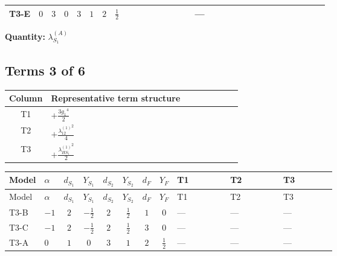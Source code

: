 \documentclass[8pt]{article}
\begin{document}
\begin{landscape}
\begin{longtable}{@{}llcccccc >{\raggedright\arraybackslash}p{0.21\linewidth} >{\raggedright\arraybackslash}p{0.21\linewidth} >{\raggedright\arraybackslash}p{0.21\linewidth}@{}}
\midrule
T3-E & $0$ & $3$ & $0$ & $3$ & $1$ & $2$ & $\frac{1}{2}$ & \scriptsize\adjustbox{max width=\linewidth}{$\begin{gathered} +\frac{3 {g_2}^4}{4}\end{gathered}$} & --- & \scriptsize\adjustbox{max width=\linewidth}{$\begin{gathered} +{g_2}^2 (-3 {\lambda_{S_1}^{(1)}}-24 {\lambda_{S_1}^{(A)}})\end{gathered}$} \\
\midrule
\bottomrule
\end{longtable}
\clearpage
\noindent\textbf{Quantity: }$\lambda_{S_1}^{(A)}$\par\smallskip
\subsection*{Terms 3 of 6}
\begin{center}
\begin{tabular}{@{}c >{\raggedright\arraybackslash}p{0.82\linewidth}@{}}
\toprule
Column & Representative term structure \\
\midrule
T1 & \(\displaystyle +\frac{3 {g_1}^4}{2}\) \\
\midrule
T2 & \(\displaystyle +\frac{{\lambda_{12}^{(1)}}^2}{4}\) \\
\midrule
T3 & \(\displaystyle +\frac{{\lambda_{HS_1}^{(1)}}^2}{2}\) \\
\midrule
\bottomrule
\end{tabular}
\end{center}
\smallskip
\tiny
\begin{longtable}{@{}llcccccc >{\raggedright\arraybackslash}p{0.21\linewidth} >{\raggedright\arraybackslash}p{0.21\linewidth} >{\raggedright\arraybackslash}p{0.21\linewidth}@{}}
\toprule
Model & $\alpha$ & $d_{S_1}$ & $Y_{S_1}$ & $d_{S_2}$ & $Y_{S_2}$ & $d_F$ & $Y_F$ & T1 & T2 & T3 \\
\midrule
\endfirsthead
\toprule
Model & $\alpha$ & $d_{S_1}$ & $Y_{S_1}$ & $d_{S_2}$ & $Y_{S_2}$ & $d_F$ & $Y_F$ & T1 & T2 & T3 \\
\midrule
\endhead
T3-B & $-1$ & $2$ & $-\frac{1}{2}$ & $2$ & $\frac{1}{2}$ & $1$ & $0$ & --- & --- & --- \\
\midrule
T3-C & $-1$ & $2$ & $-\frac{1}{2}$ & $2$ & $\frac{1}{2}$ & $3$ & $0$ & --- & --- & --- \\
\midrule
T3-A & $0$ & $1$ & $0$ & $3$ & $1$ & $2$ & $\frac{1}{2}$ & --- & --- & --- \\
\midrule

\end{longtable}
\end{landscape}
\end{document}
